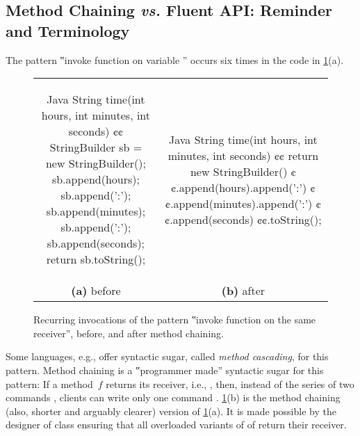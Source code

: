 \subsection{Method Chaining \emph{vs.} Fluent API: Reminder and Terminology}
The pattern ‟invoke function on variable ” occurs
six times in the code in \cref{Figure:chaining}(a).

\begin{figure}[H]
  \caption{\label{Figure:chaining}%
    Recurring invocations of the pattern ‟invoke function on the same
      receiver”, before, and after method chaining.
  }%
    \begin{tabular}{@{}cc@{}}%
  \begin{lcode}[minipage,width=44ex,box align=center]{Java}
String time(int hours, int minutes, int seconds) {¢¢
  StringBuilder sb = new StringBuilder();
  sb.append(hours);
  sb.append(':');
  sb.append(minutes);
  sb.append(':');
  sb.append(seconds);
  return sb.toString();
}\end{lcode}
\hfill
&
\hspace{1ex}
  \begin{lcode}[minipage,width=44ex,box align=center]{Java}
String time(int hours, int minutes, int seconds) {¢¢
    return new StringBuilder()
      ¢¢.append(hours).append(':')
      ¢¢.append(minutes).append(':')
      ¢¢.append(seconds)
      ¢¢.toString();
}\end{lcode}
\\
\textbf{(a)} before & \textbf{(b)} after 
\end{tabular}
\end{figure}

Some languages, e.g., \Smalltalk offer syntactic sugar, called \emph{method cascading}, for this pattern.
Method chaining is a ‟programmer made” syntactic sugar for this pattern:
  If a method~$f$ returns its receiver, i.e., ,
  then, instead of the series of two commands \mbox{}, clients can write
  only one command \mbox{}.
  \cref{Figure:chaining}(b) is the method chaining
  (also, shorter and arguably clearer) version of
  \cref{Figure:chaining}(a).
It is made possible by the designer of class  ensuring that all overloaded variants of
  of  return their receiver.

